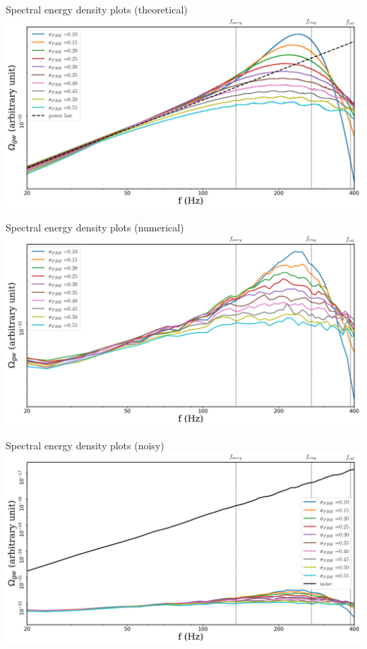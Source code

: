 \begin{frame}{Spectral energy density plots (theoretical)}
\centering
\includegraphics[width=.9\linewidth]{img/theoretical}
\end{frame}

\begin{frame}{Spectral energy density plots (numerical)}
	\centering
	\includegraphics[width=.9\linewidth]{img/numerical}
\end{frame}

\begin{frame}{Spectral energy density plots (noisy)}
	\centering
	\includegraphics[width=.9\linewidth]{img/noisy}
\end{frame}

